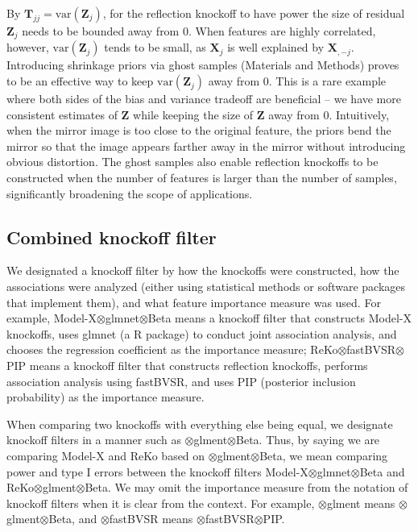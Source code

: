 \documentclass[12pt,Times]{article}
\def\T{{\mathbf{T}}}
\def\X{{\mathbf{X}}}
\def\Z{{\mathbf{Z}}}
\def\var{{\textrm{var}}}
\begin{document}
By $\T_{jj} = \var(\Z_j)$, for the reflection knockoff to have power  the size of residual $\Z_j$ needs to be bounded away from $0$.   
When features are highly correlated, however, $\var(\Z_j)$ tends to be small, as $\X_j$ is well explained by $\X_{,-j}$.  Introducing shrinkage priors via ghost samples (Materials and Methods) proves to be an effective way to keep $\var(\Z_j)$ away from $0$.  
This is a rare example where both sides of the bias and variance tradeoff are beneficial -- we have more consistent estimates of $\Z$ while keeping the size of $\Z$ away from $0.$  Intuitively, when the mirror image is too close to the original feature, the priors bend the mirror so that the image appears farther away in the mirror without introducing obvious distortion. The ghost samples also enable reflection knockoffs to be constructed when the number of features is larger than the number of samples, significantly broadening the scope of applications.   




\subsection{Combined knockoff filter}
  
We designated a knockoff filter by how the knockoffs were constructed, how the associations were analyzed (either using statistical methods or software packages that implement them), and what feature importance measure was used.  For example, Model-X\allowbreak$\otimes$glmnet\allowbreak$\otimes$Beta means a knockoff filter that constructs Model-X knockoffs, uses glmnet (a R package) to conduct joint association analysis, and chooses the regression coefficient as the importance measure; 
ReKo\allowbreak$\otimes$fastBVSR\allowbreak$\otimes$PIP means a knockoff filter that constructs reflection knockoffs, performs association analysis using fastBVSR, and uses PIP (posterior inclusion probability) as the importance measure.  

When comparing two knockoffs with everything else being equal, we designate knockoff filters in a manner such as $\otimes$glment\allowbreak$\otimes$Beta. Thus, by saying we are comparing Model-X and ReKo based on $\otimes$glment\allowbreak$\otimes$Beta, we mean comparing power and type I errors between the knockoff filters Model-X\allowbreak$\otimes$glmnet\allowbreak$\otimes$Beta and ReKo\allowbreak$\otimes$glment\allowbreak$\otimes$Beta.  We may omit the  importance measure from the notation of knockoff filters when it is clear from the context. For example, $\otimes$glment means $\otimes$glment$\otimes$Beta, and $\otimes$fastBVSR means $\otimes$fastBVSR$\otimes$PIP.  
  
\end{document}
